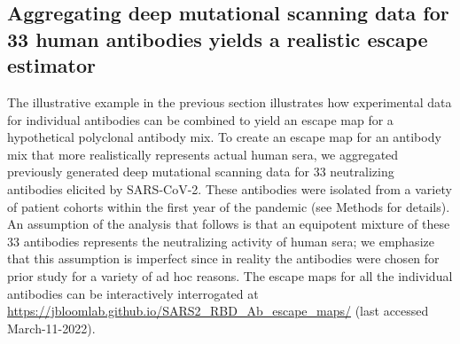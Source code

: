 \documentclass[9pt,twocolumn,twoside]{gsajnl_modified}
\begin{document}
\subsection{Aggregating deep mutational scanning data for 33 human antibodies yields a realistic escape estimator}
The illustrative example in the previous section illustrates how experimental data for individual antibodies can be combined to yield an escape map for a hypothetical polyclonal antibody mix.
To create an escape map for an antibody mix that more realistically represents actual human sera, we aggregated previously generated deep mutational scanning data for 33 neutralizing antibodies elicited by SARS-CoV-2.
These antibodies were isolated from a variety of patient cohorts within the first year of the pandemic (see Methods for details).
An assumption of the analysis that follows is that an equipotent mixture of these 33 antibodies represents the neutralizing activity of human sera; we emphasize that this assumption is imperfect since in reality the antibodies were chosen for prior study for a variety of ad hoc reasons.
The escape maps for all the individual antibodies can be interactively interrogated at \url{https://jbloomlab.github.io/SARS2_RBD_Ab_escape_maps/} (last accessed March-11-2022).
\end{document}
